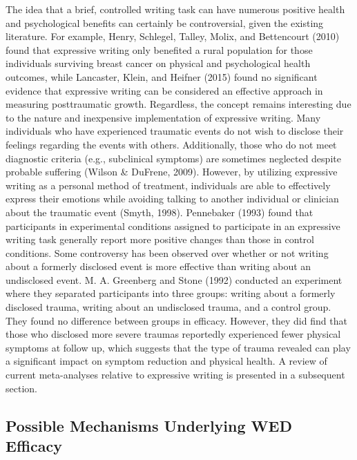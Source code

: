 \documentclass[man, mask]{apa6}
\theoremstyle{definition}
\theoremstyle{definition}
\theoremstyle{definition}
\theoremstyle{remark}
\begin{document}
The idea that a brief, controlled writing task can have numerous
positive health and psychological benefits can certainly be
controversial, given the existing literature. For example, Henry,
Schlegel, Talley, Molix, and Bettencourt (2010) found that expressive
writing only benefited a rural population for those individuals
surviving breast cancer on physical and psychological health outcomes,
while Lancaster, Klein, and Heifner (2015) found no significant evidence
that expressive writing can be considered an effective approach in
measuring posttraumatic growth. Regardless, the concept remains
interesting due to the nature and inexpensive implementation of
expressive writing. Many individuals who have experienced traumatic
events do not wish to disclose their feelings regarding the events with
others. Additionally, those who do not meet diagnostic criteria (e.g.,
subclinical symptoms) are sometimes neglected despite probable suffering
(Wilson \& DuFrene, 2009). However, by utilizing expressive writing as a
personal method of treatment, individuals are able to effectively
express their emotions while avoiding talking to another individual or
clinician about the traumatic event (Smyth, 1998). Pennebaker (1993)
found that participants in experimental conditions assigned to
participate in an expressive writing task generally report more positive
changes than those in control conditions. Some controversy has been
observed over whether or not writing about a formerly disclosed event is
more effective than writing about an undisclosed event. M. A. Greenberg
and Stone (1992) conducted an experiment where they separated
participants into three groups: writing about a formerly disclosed
trauma, writing about an undisclosed trauma, and a control group. They
found no difference between groups in efficacy. However, they did find
that those who disclosed more severe traumas reportedly experienced
fewer physical symptoms at follow up, which suggests that the type of
trauma revealed can play a significant impact on symptom reduction and
physical health. A review of current meta-analyses relative to
expressive writing is presented in a subsequent section.

\subsection{Possible Mechanisms Underlying WED
Efficacy}\label{possible-mechanisms-underlying-wed-efficacy}
\end{document}
